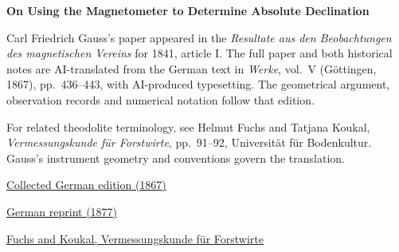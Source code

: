 \clearpage
\thispagestyle{empty}
\begin{center}\Large\textbf{On Using the Magnetometer to Determine Absolute Declination}\end{center}

Carl Friedrich Gauss’s paper appeared in the \textit{Resultate aus den Beobachtungen des magnetischen Vereins} for 1841, article I. The full paper and both historical notes are AI-translated from the German text in \textit{Werke}, vol.~V (Göttingen, 1867), pp.~436--443, with AI-produced typesetting. The geometrical argument, observation records and numerical notation follow that edition.

\medskip\noindent
For related theodolite terminology, see Helmut Fuchs and Tatjana Koukal, \textit{Vermessungskunde für Forstwirte}, pp.~91--92, Universität für Bodenkultur. Gauss’s instrument geometry and conventions govern the translation.

\medskip\noindent
\href{https://gdz.sub.uni-goettingen.de/id/PPN236006339}{Collected German edition (1867)}\par
\noindent\href{https://doi.org/10.1007/978-3-642-49319-5_21}{German reprint (1877)}\par
\noindent\href{https://boku.ac.at/fileadmin/data/H03000/H85000/H85700/skripten/857143/Vermessungskunde-FW.pdf}{Fuchs and Koukal, Vermessungskunde für Forstwirte}
\clearpage
